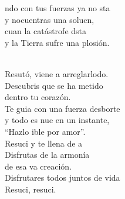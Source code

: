 \documentclass[12pt]{article}
\begin{document}
\begin{multicols*}{2}
\begin{cancion}
	ndo con tus fuerzas ya no sta\\
	y nocuentras una solucn,\\
	cuan la catástrofe dsta\\
	y la Tierra sufre una plosión.\\\jump\\
	\begin{chorus}%
	Resutó, viene a arreglarlodo.\\
	Descubris que se ha metido  \\
	dentro tu corazón.\\
	Te guia con una fuerza desborte \\
	y todo es nue en un instante,\\
	“Hazlo ible por amor”.\\
	Resuci y te llena de a \\
	Disfrutas de la armonía  \\
	de esa va creación.\\
	Disfrutares todos juntos de vida\\
	Resuci, resuci. \\
	\end{chorus}%
	\jump\\
\end{cancion}%


\end{multicols*}
\end{document}
